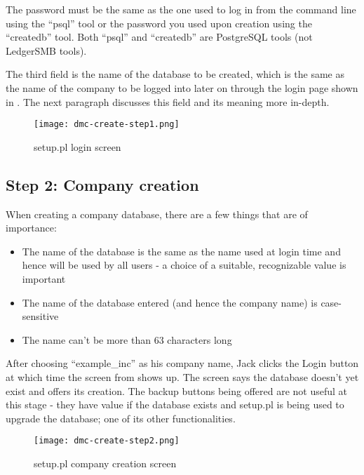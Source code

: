 The password must be the same as the one used to log in from the command line using the
``psql'' tool or the password you used upon creation using the ``createdb'' tool. Both
``psql'' and ``createdb'' are PostgreSQL tools (not LedgerSMB tools).

The third field is the name of the database to be created, which is the same as the
name of the company to be logged into later on through the login page shown in . The next paragraph discusses this field and its meaning more
in-depth.

\begin{figure}[h]
\centering
\texttt{[image: dmc-create-step1.png]}
\caption{setup.pl login screen}
\label{fig:setup-step1}
\end{figure}

\subsection{Step 2: Company creation}
\label{subsec-create-setup-create}

When creating a company database, there are a few things that are of importance:

\begin{itemize}
\item The name of the database is the same as the name used at login time and hence
   will be used by all users - a choice of a suitable, recognizable value is important
\item The name of the database entered (and hence the company name) is case-sensitive
\item The name can't be more than 63 characters long
\end{itemize}

After choosing ``example\_inc'' as his company name, Jack clicks the Login button at which
time the screen from  shows up. The screen says the database doesn't
yet exist and offers its creation. The backup buttons being offered are not useful at this
stage - they have value if the database exists and setup.pl is being used to upgrade
the database; one of its other functionalities.

\begin{figure}[h]
\centering
\texttt{[image: dmc-create-step2.png]}
\caption{setup.pl company creation screen}
\label{fig:setup-step2}
\end{figure}

